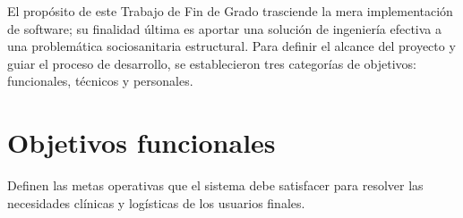 
El propósito de este Trabajo de Fin de Grado trasciende la mera implementación de software; su finalidad última es aportar una solución de ingeniería efectiva a una problemática sociosanitaria estructural. Para definir el alcance del proyecto y guiar el proceso de desarrollo, se establecieron tres categorías de objetivos: funcionales, técnicos y personales.

\section{Objetivos funcionales}

Definen las metas operativas que el sistema debe satisfacer para resolver las necesidades clínicas y logísticas de los usuarios finales.

